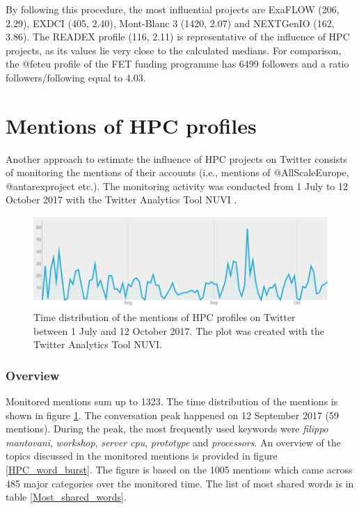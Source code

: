 By following this procedure, the most influential projects are ExaFLOW (206, 2.29), EXDCI (405, 2.40), Mont-Blanc 3 (1420, 2.07) and NEXTGenIO (162, 3.86). The READEX profile (116, 2.11) is representative of the influence of HPC projects, as its values lie very close to the calculated medians. For comparison, the @fet\textunderscore eu profile of the FET funding programme has 6499 followers and a ratio followers/following equal to 4.03.

\section{Mentions of HPC profiles} \label{Mentions_of_HPC_profiles} 
Another approach to estimate the influence of HPC projects on Twitter consists of monitoring the mentions of their accounts (i.e., mentions of @AllScaleEurope, @antarex\textunderscore project etc.). The monitoring activity was conducted from 1 July to 12 October 2017 with the Twitter Analytics Tool NUVI \cite{NUVI}.  

\begin{figure}[!t] 
 \begin{center}
 \includegraphics[scale=0.4]{Images/NUVI_time_distribution.png}
 \caption{Time distribution of the mentions of HPC profiles on Twitter between 1 July and 12 October 2017. The plot was created with the Twitter Analytics Tool NUVI.}
 \label{NUVI_time_distribution}
 \end{center}
\end{figure}

\subsubsection{Overview}
Monitored mentions sum up to 1323. The time distribution of the mentions is shown in figure \ref{NUVI_time_distribution}. The conversation peak happened on 12 September 2017 (59 mentions). During the peak, the most frequently used keywords were \textit{filippo mantovani}, \textit{workshop}, \textit{server cpu}, \textit{prototype} and \textit{processors}. An overview of the topics discussed in the monitored mentions is provided in figure \ref{HPC_word_burst}. The figure is based on the 1005 mentions which came across 485 major categories over the monitored time. The list of most shared words is in table \ref{Most_shared_words}.

